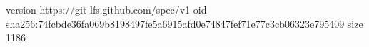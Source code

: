 version https://git-lfs.github.com/spec/v1
oid sha256:74fcbde36fa069b8198497fe5a6915afd0e74847fef71e77c3cb06323e795409
size 1186
